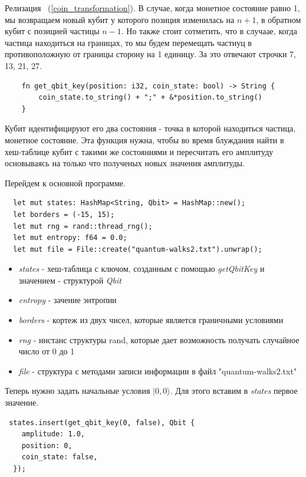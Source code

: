 \documentclass[a4paper]{report}
\begin{document}
Релизация ~(\ref {coin_transformation}). В случае, когда монетное состояние равно 1, мы возвращаем новый кубит у которого позиция изменилась на  $n + 1$, в обратном кубит с позицией частицы $n - 1$. Но также стоит сотметить, что в случаае, когда частица находиться на границах, то мы будем перемещать частиуц в противоположную от границы сторону на 1 единицу. За это отвечают строчки 7, 13, 21, 27.

\begin{lstlisting}
    fn get_qbit_key(position: i32, coin_state: bool) -> String {
        coin_state.to_string() + ";" + &*position.to_string()
    }
\end{lstlisting}

Кубит идентифицируют его два состояния - точка в которой находиться частица, монетное состояние. Эта функция нужна, чтобы во время блуждания найти в хеш-таблице кубит с такими же состояниями и пересчитать его амплитуду основываясь на только что полученых новых значения амплитуды.

Перейдем к основной программе.

\begin{lstlisting}
  let mut states: HashMap<String, Qbit> = HashMap::new();
  let borders = (-15, 15);
  let mut rng = rand::thread_rng();
  let mut entropy: f64 = 0.0;
  let mut file = File::create("quantum-walks2.txt").unwrap();
\end{lstlisting}

\begin{itemize}
  \item \textit{states} - хеш-таблица с ключом, созданным с помощью \textit{getQbitKey} и значением - структурой \textit{Qbit}
  \item \textit{entropy} - зачение энтропии
  \item \textit{borders} - кортеж из двух чисел, которые является граничными условиями
  \item \textit{rng} - инстанс структуры rand, которые дает возможность получать случайное число от 0 до 1
  \item \textit{file} - структура с методами записи информации в файл "quantum-walks2.txt"
\end{itemize}

Теперь нужно задать начальные условия $|0, 0\rangle$. Для этого вставим в \textit{states} первое значение.

\begin{lstlisting}
 states.insert(get_qbit_key(0, false), Qbit {
    amplitude: 1.0,
    position: 0,
    coin_state: false,
  });
\end{lstlisting}
\end{document}
